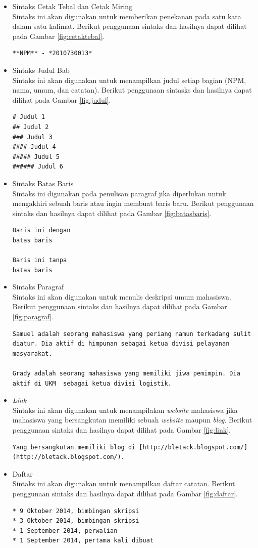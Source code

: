 \begin{itemize}
\item Sintaks Cetak Tebal dan Cetak Miring\\
Sintaks ini akan digunakan untuk memberikan penekanan pada satu kata dalam satu
kalimat. Berikut penggunaan sintaks dan hasilnya dapat dilihat pada Gambar
\ref{fig:cetaktebal}.
\begin{lstlisting}
**NPM** - *2010730013*
\end{lstlisting}
\item Sintaks Judul Bab\\
Sintaks ini akan digunakan untuk menampilkan judul setiap bagian (NPM, nama,
umum, dan catatan). Berikut penggunaan sintasks dan hasilnya dapat dilihat pada
Gambar \ref{fig:judul}.
\begin{lstlisting}
# Judul 1
## Judul 2
### Judul 3
#### Judul 4
##### Judul 5
###### Judul 6
\end{lstlisting}
\item Sintaks Batas Baris\\
Sintaks ini digunakan pada penulisan paragraf jika diperlukan untuk mengakhiri
sebuah baris atau ingin membuat baris baru. Berikut penggunaan sintaks dan
hasilnya dapat dilihat pada Gambar \ref{fig:batasbaris}.
\begin{lstlisting}
Baris ini dengan   
batas baris

Baris ini tanpa
batas baris
\end{lstlisting}
\item Sintaks Paragraf\\
Sintaks ini akan digunakan untuk menulis deskripsi umum mahasiswa. Berikut
penggunaan sintaks dan hasilnya dapat dilihat pada Gambar \ref{fig:paragraf}.
\begin{lstlisting}
Samuel adalah seorang mahasiswa yang periang namun terkadang sulit diatur. Dia aktif di himpunan sebagai ketua divisi pelayanan masyarakat.

Grady adalah seorang mahasiswa yang memiliki jiwa pemimpin. Dia aktif di UKM  sebagai ketua divisi logistik.
\end{lstlisting}
\item {\it Link}\\
Sintaks ini akan digunakan untuk menampilakan {\it website} mahasiswa jika
mahasiswa yang bersangkutan memiliki sebuah {\it website} maupun {\it blog}.
Berikut penggunaan sintaks dan hasilnya dapat dilihat pada Gambar \ref{fig:link}.
\begin{lstlisting}
Yang bersangkutan memiliki blog di [http://bletack.blogspot.com/](http://bletack.blogspot.com/).
\end{lstlisting}
\item Daftar\\
Sintaks ini akan digunakan untuk menampilkan daftar catatan. Berikut penggunaan
sintaks dan hasilnya dapat dilihat pada Gambar \ref{fig:daftar}.
\begin{lstlisting}
* 9 Oktober 2014, bimbingan skripsi
* 3 Oktober 2014, bimbingan skripsi
* 1 September 2014, perwalian
* 1 September 2014, pertama kali dibuat
\end{lstlisting}
\end{itemize}

